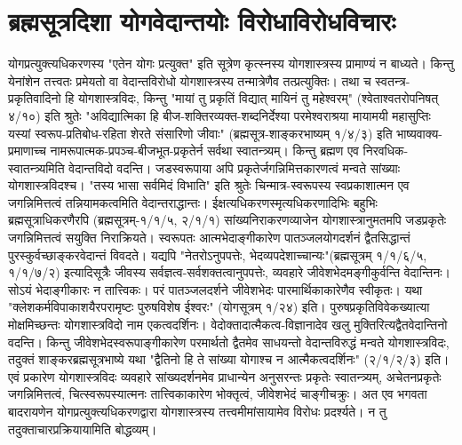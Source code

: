 {\section*{ब्रह्मसूत्रदिशा योगवेदान्तयोः विरोधाविरोधविचारः}

योगप्रत्युक्त्यधिकरणस्य "एतेन योगः प्रत्युक्त" इति सूत्रेण कृत्स्नस्य योगशास्त्रस्य प्रामाण्यं न बाध्यते। किन्तु येनांशेन तत्त्वतः प्रमेयतो वा वेदान्तविरोधो योगशास्त्रस्य तन्मात्रेणैव तत्प्रत्युक्तिः। तथा च स्वतन्त्र-प्रकृतिवादिनो हि योगशास्त्रविदः, किन्तु "मायां तु प्रकृतिं विद्यात् मायिनं तु महेश्वरम्" (श्वेताश्वतरोपनिषत् ४/१०) इति श्रुतेः "अविद्यात्मिका हि बीज-शक्तिरव्यक्त-शब्दनिर्देश्या परमेश्वराश्रया मायामयी महासुप्तिः यस्यां स्वरूप-प्रतिबोध-रहिता शेरते संसारिणो जीवाः" (ब्रह्मसूत्र-शाङ्करभाष्यम् १/४/३) इति भाष्यवाक्य-प्रमाणाच्च नामरूपात्मक-प्रपञ्च-बीजभूत-प्रकृतेर्न सर्वथा स्वातन्त्र्यम्। किन्तु ब्रह्मण एव निरवधिक-स्वातन्त्र्यमिति वेदान्तविदो वदन्ति। जडस्वरूपाया अपि प्रकृतेर्जगन्निमित्तकारणत्वं मन्वते सांख्याः योगशास्त्रविदश्च। "तस्य भासा सर्वमिदं विभाति" इति श्रुतेः चिन्मात्र-स्वरूपस्य स्वप्रकाशात्मन एव जगन्निमित्तत्वं तन्नियामकत्वमिति वेदान्तराद्धान्तः। ईक्षत्यधिकरणस्मृत्यधिकरणादिभिः बहुभिः ब्रह्मसूत्राधिकरणैरपि (ब्रह्मसूत्रम्-१/१/५, २/१/१) सांख्यनिराकरणव्याजेन योगशास्त्रानुमतमपि जडप्रकृतेः जगन्निमित्तत्वं सयुक्ति निराक्रियते। स्वरूपतः आत्मभेदाङ्गीकारेण पातञ्जलयोगदर्शनं द्वैतसिद्धान्तं पुरस्कुर्वच्छाङ्करवेदान्तं विवदते। यद्यपि "नेतरोऽनुपपत्तेः, भेदव्यपदेशाच्चान्यः"(ब्रह्मसूत्रम् १/१/६/५, १/१/७/२) इत्यादिसूत्रैः जीवस्य सर्वज्ञत्व-सर्वशक्तत्वानुपपत्तेः, व्यवहारे जीवेशभेदमङ्गीकुर्वन्ति वेदान्तिनः। सोऽयं भेदाङ्गीकारः न तात्त्विकः। परं पातञ्जलदर्शने जीवेशभेदः पारमार्थिकाकारेणैव स्वीकृतः। यथा "क्लेशकर्मविपाकाशयैरपरामृष्टः पुरुषविशेष ईश्वरः" (योगसूत्रम् १/२४) इति। पुरुषप्रकृतिविवेकख्यात्या मोक्षमिच्छन्तः योगशास्त्रविदो नाम एकत्वदर्शिनः। वेदोक्तादात्मैकत्व-विज्ञानादेव खलु मुक्तिरित्यद्वैतवेदान्तिनो वदन्ति। किन्तु जीवेशभेदस्वरूपाङ्गीकारेण परमार्थतो द्वैतमेव साधयन्तो वेदान्तविरुद्धं मन्वते योगशास्त्रविदः, तदुक्तं शाङ्करब्रह्मसूत्रभाष्ये यथा "द्वैतिनो हि ते सांख्या योगाश्च न आत्मैकत्वदर्शिनः" (२/१/२/३) इति। एवं प्रकारेण योगशास्त्रविदः व्यवहारे सांख्यदर्शनमेव प्राधान्येन अनुसरन्तः प्रकृतेः स्वातन्त्र्यम्, अचेतनप्रकृतेः जगन्निमित्तत्वं, चित्स्वरूपस्यात्मनः तात्त्विकाकारेण भोक्तृत्वं, जीवेशभेदं चाङ्गीचक्रुः। अत एव भगवता बादरायणेन योगप्रत्युक्त्यधिकरणद्वारा योगशास्त्रस्य तत्त्वमीमांसायामेव विरोधः प्रदर्श्यते। न तु तदुक्ताचारप्रक्रियायामिति बोद्धव्यम्।

}
